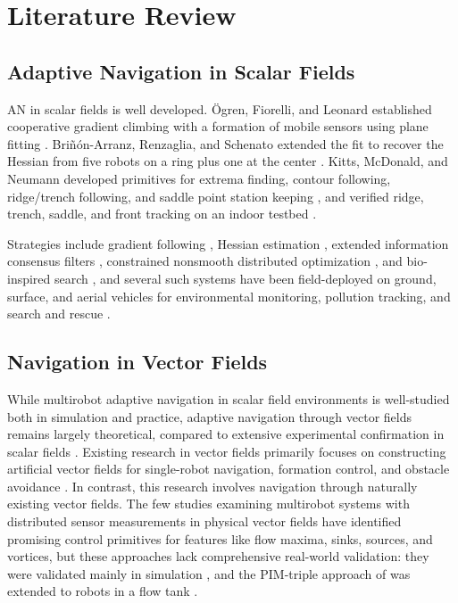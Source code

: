 \section{Literature Review}
\label{sec:ch1:lit}

\subsection{Adaptive Navigation in Scalar Fields}

AN in scalar fields is well developed. \"{O}gren, Fiorelli, and Leonard
established cooperative gradient climbing with a formation of mobile
sensors using plane fitting \cite{14}. Bri\~{n}\'{o}n-Arranz, Renzaglia, and Schenato
extended the fit to recover the Hessian from five robots on a ring plus
one at the center \cite{15}. Kitts, McDonald, and
Neumann developed primitives for extrema finding, contour following,
ridge/trench following, and saddle point station keeping \cite{3}, and
verified ridge, trench, saddle, and front tracking on an indoor testbed
\cite{16,17}.

Strategies include gradient following \cite{2}, Hessian estimation \cite{15}, extended information consensus filters \cite{18,19}, constrained nonsmooth distributed optimization \cite{20}, and bio-inspired search \cite{21}, and several such systems have been field-deployed on ground, surface, and aerial vehicles for environmental monitoring, pollution tracking, and search and rescue \cite{2,22,23,24}.

\subsection{Navigation in Vector Fields}

While multirobot adaptive navigation in scalar field environments is
well-studied both in simulation and practice, adaptive navigation through
vector fields remains largely theoretical, compared to extensive
experimental confirmation in scalar fields \cite{16}. Existing research
in vector fields primarily focuses on constructing artificial vector
fields for single-robot navigation, formation control, and obstacle
avoidance \cite{25}. In contrast, this research involves navigation
through naturally existing vector fields. The few studies examining
multirobot systems with distributed sensor measurements in physical
vector fields have identified promising control primitives for features
like flow maxima, sinks, sources, and vortices, but these approaches lack
comprehensive real-world validation: they were validated mainly in
simulation \cite{26}, and the PIM-triple approach of \cite{27} was
extended to robots in a flow tank \cite{28}.

